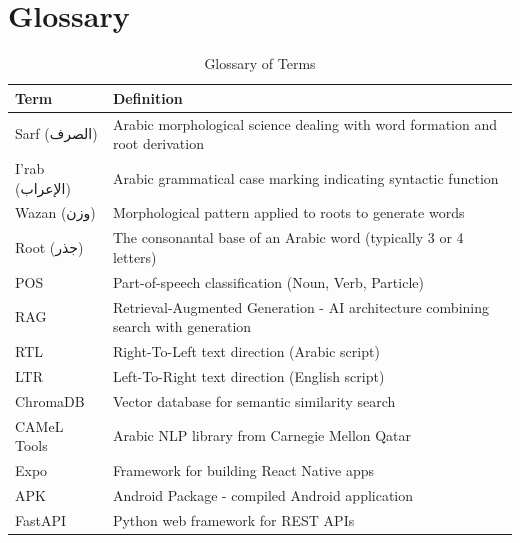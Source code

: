 \documentclass[11pt, a4paper]{article}
\begin{document}
\section{Glossary}

\begin{table}[H]
\caption{Glossary of Terms}
\label{tab:glossary}
\begin{tabular}{|l|p{10cm}|}
\toprule
\textbf{Term} & \textbf{Definition} \\
\midrule
Sarf (الصرف) & Arabic morphological science dealing with word formation and root derivation \\
\midrule
I'rab (الإعراب) & Arabic grammatical case marking indicating syntactic function \\
\midrule
Wazan (وزن) & Morphological pattern applied to roots to generate words \\
\midrule
Root (جذر) & The consonantal base of an Arabic word (typically 3 or 4 letters) \\
\midrule
POS & Part-of-speech classification (Noun, Verb, Particle) \\
\midrule
RAG & Retrieval-Augmented Generation - AI architecture combining search with generation \\
\midrule
RTL & Right-To-Left text direction (Arabic script) \\
\midrule
LTR & Left-To-Right text direction (English script) \\
\midrule
ChromaDB & Vector database for semantic similarity search \\
\midrule
CAMeL Tools & Arabic NLP library from Carnegie Mellon Qatar \\
\midrule
Expo & Framework for building React Native apps \\
\midrule
APK & Android Package - compiled Android application \\
\midrule
FastAPI & Python web framework for REST APIs \\
\bottomrule
\end{tabular}
\end{table}
\end{document}
